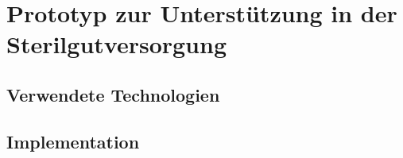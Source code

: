 \chapter{Prototyp zur Unterstützung in der Sterilgutversorgung}
%
%
\section{Verwendete Technologien}
%
%
\section{Implementation}
